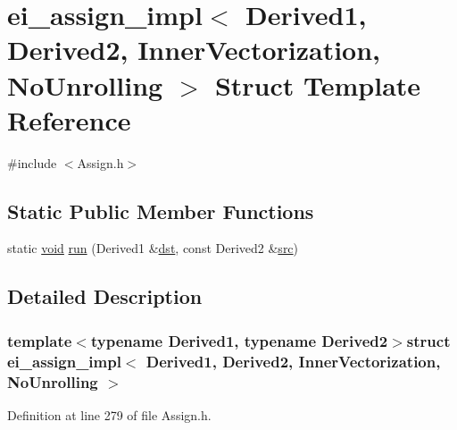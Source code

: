 \hypertarget{structei__assign__impl_3_01_derived1_00_01_derived2_00_01_inner_vectorization_00_01_no_unrolling_01_4}{\section{ei\-\_\-assign\-\_\-impl$<$ Derived1, Derived2, Inner\-Vectorization, No\-Unrolling $>$ Struct Template Reference}
\label{structei__assign__impl_3_01_derived1_00_01_derived2_00_01_inner_vectorization_00_01_no_unrolling_01_4}
}


{\ttfamily \#include $<$Assign.\-h$>$}

\subsection*{Static Public Member Functions}
\begin{DoxyCompactItemize}
\item 
static \hyperlink{group___u_a_v_objects_plugin_ga444cf2ff3f0ecbe028adce838d373f5c}{void} \hyperlink{structei__assign__impl_3_01_derived1_00_01_derived2_00_01_inner_vectorization_00_01_no_unrolling_01_4_aedf0c0cefc8b64e30f36be564d1aab11}{run} (Derived1 \&\hyperlink{glext_8h_a92034251bfd455d524a9b5610cddba00}{dst}, const Derived2 \&\hyperlink{glext_8h_a72e0fdf0f845ded60b1fada9e9195cd7}{src})
\end{DoxyCompactItemize}


\subsection{Detailed Description}
\subsubsection*{template$<$typename Derived1, typename Derived2$>$struct ei\-\_\-assign\-\_\-impl$<$ Derived1, Derived2, Inner\-Vectorization, No\-Unrolling $>$}



Definition at line 279 of file Assign.\-h.



